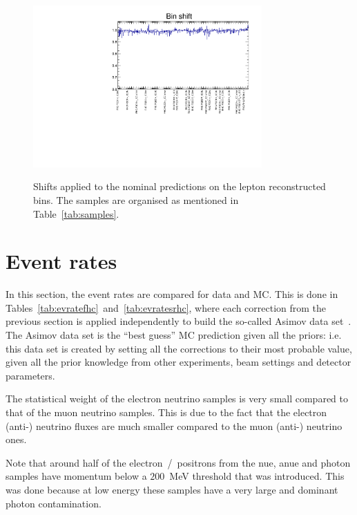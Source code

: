 \begin{figure}[ht]
  \center
  \includegraphics[width=0.78\textwidth]{images/BANFF/Varied_Mean_over_Nominal.pdf} \\
  \caption[Shifts applied to the nominal predictions on the lepton
  reconstructed bins]{Shifts applied to the nominal predictions on the
    lepton reconstructed bins. The samples are organised as mentioned
    in Table~\ref{tab:samples}.}
  \label{fig:totndcovshift}
\end{figure}
\clearpage

\section{Event rates}
\label{sec:eventrates}
In this section, the event rates are compared for data and
\Gls{MC}. This is done in
Tables~\ref{tab:evratefhc}~and~\ref{tab:evratesrhc}, where each
correction from the previous section is applied independently to build
the so-called \Gls{Asimov} data set~\cite{Cowan:2010js}. The
\Gls{Asimov} data set is the ``best guess'' \Gls{MC} prediction given
all the priors: i.e. this data set is created by setting all the
corrections to their most probable value, given all the prior
knowledge from other experiments, beam settings and detector
parameters.

The statistical weight of the electron neutrino samples is very small
compared to that of the muon neutrino samples. This is due to the fact
that the electron (anti-) neutrino fluxes are much smaller compared to
the muon (anti-) neutrino ones.

Note that around half of the electron~/~positrons from the \Gls{nue},
\Gls{anue} and photon samples have momentum below a $200$~MeV
threshold that was introduced. This was done because at low energy
these samples have a very large and dominant photon contamination.

